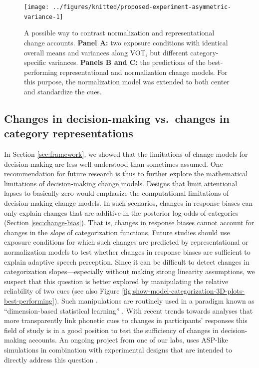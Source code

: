 \documentclass[
  11pt,
  man,floatsintext]{apa6}
\begin{document}
\begin{figure}

{\centering \texttt{[image: ../figures/knitted/proposed-experiment-asymmetric-variance-1]} 

}

\caption{A possible way to contrast normalization and representational change accounts. \textbf{Panel A:} two exposure conditions with identical overall means and variances along VOT, but different category-specific variances. \textbf{Panels B and C:} the predictions of the best-performing representational and normalization change models. For this purpose, the normalization model was extended to both center and standardize the cues.}\label{fig:proposed-experiment-asymmetric-variance}
\end{figure}

\hypertarget{changes-in-decision-making-vs.-changes-in-category-representations}{%
\subsection{Changes in decision-making vs.~changes in category representations}\label{changes-in-decision-making-vs.-changes-in-category-representations}}

In Section \ref{sec:framework}, we showed that the limitations of change models for decision-making are less well understood than sometimes assumed. One recommendation for future research is thus to further explore the mathematical limitations of decision-making change models. Designs that limit attentional lapses to basically zero \autocites[e.g., by employing more engaging tasks, as in gamified paradigms,][]{wade-holt2005,lim-holt2011} would emphasize the computational limitations of decision-making change models. In such scenarios, changes in response biases can only explain changes that are additive in the posterior log-odds of categories (Section \ref{sec:change-bias}). That is, changes in response biases cannot account for changes in the \emph{slope} of categorization functions. Future studies should use exposure conditions for which such changes are predicted by representational or normalization models to test whether changes in response biases are sufficient to explain adaptive speech perception. Since it can be difficult to detect changes in categorization slopes---especially without making strong linearity assumptions, we suspect that this question is better explored by manipulating the relative reliability of two cues (see also Figure \ref{fig:show-model-categorization-3D-plots-best-performing}). Such manipulations are routinely used in a paradigm known as ``dimension-based statistical learning'' \autocite{idemaru-holt2011,lehet-holt2020,liu-holt2015}. With recent trends towards analyses that more transparently link phonetic cues to changes in participants' responses \autocites{idemaru-holt2020}[see also Section \ref{sec:methodological-advances}]{schertz-clare2020} this field of study is in a good position to test the sufficiency of changes in decision-making accounts. An ongoing project from one of our labs, uses ASP-like simulations in combination with experimental designs that are intended to directly address this question \autocite{burchill-jaeger2022}.
\end{document}

